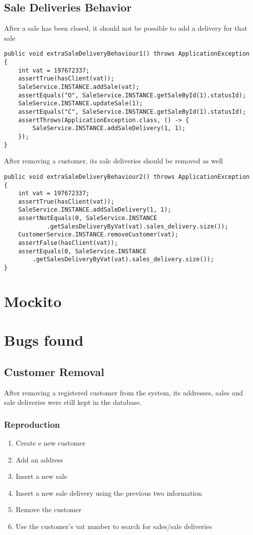 \documentclass[12pt]{article}
\begin{document}
\subsection{Sale Deliveries Behavior}
After a sale has been closed, it should not be possible to add a delivery for that sale 
\begin{lstlisting}
public void extraSaleDeliveryBehaviour1() throws ApplicationException {
	int vat = 197672337;
	assertTrue(hasClient(vat));
	SaleService.INSTANCE.addSale(vat);
	assertEquals("O", SaleService.INSTANCE.getSaleById(1).statusId);
	SaleService.INSTANCE.updateSale(1);
	assertEquals("C", SaleService.INSTANCE.getSaleById(1).statusId);
	assertThrows(ApplicationException.class, () -> {
		SaleService.INSTANCE.addSaleDelivery(1, 1);
	});		
}
\end{lstlisting}

After removing a customer, its sale deliveries should be removed as well
\begin{lstlisting}
public void extraSaleDeliveryBehaviour2() throws ApplicationException {
	int vat = 197672337;
	assertTrue(hasClient(vat));
	SaleService.INSTANCE.addSaleDelivery(1, 1);
	assertNotEquals(0, SaleService.INSTANCE
			.getSalesDeliveryByVat(vat).sales_delivery.size());
	CustomerService.INSTANCE.removeCustomer(vat);
	assertFalse(hasClient(vat));
	assertEquals(0, SaleService.INSTANCE
		.getSalesDeliveryByVat(vat).sales_delivery.size());
}
\end{lstlisting}

\newpage
\section{Mockito}


\section{Bugs found}
\subsection{Customer Removal}
After removing a registered customer from the system, its addresses, sales and sale deliveries were still kept in the database.

\subsubsection{Reproduction}
\begin{enumerate}
   \item  Create e new customer
   
   \item  Add an address
   
   \item  Insert a new sale
   
   \item  Insert a new sale delivery using the previous two information
      
   \item  Remove the customer
      
   \item  Use the customer's vat number to search for sales/sale deliveries
\end{enumerate}
\end{document}
